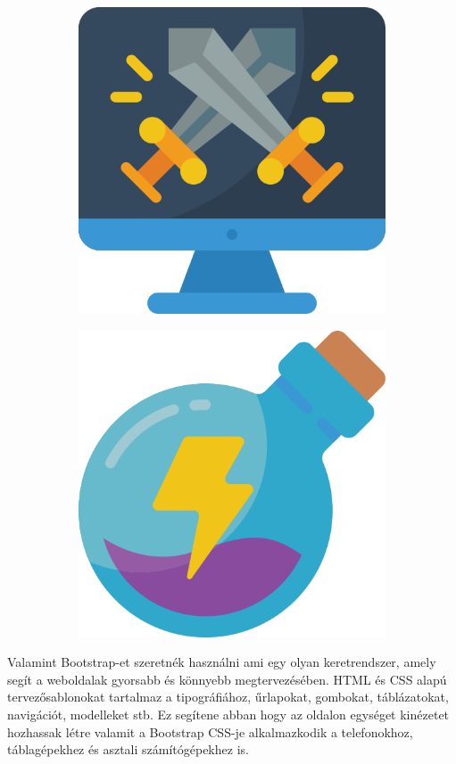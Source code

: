 \begin{figure}[h]
\begin{subfigure}{.1\textwidth}
        \includegraphics[width=.8\linewidth]{images/icons/057-computer.png}
    \end{subfigure}
    \begin{subfigure}{.1\textwidth}
        \centering
        \includegraphics[width=.8\linewidth]{images/icons/058-potion.png}
    \end{subfigure}
\end{figure}


Valamint Bootstrap-et szeretnék használni ami egy olyan keretrendszer, amely segít a weboldalak gyorsabb és könnyebb megtervezésében. HTML és CSS alapú tervezősablonokat tartalmaz a tipográfiához, űrlapokat, gombokat, táblázatokat, navigációt, modelleket stb. Ez segítene abban hogy az oldalon egységet kinézetet hozhassak létre valamit a Bootstrap CSS-je alkalmazkodik a telefonokhoz, táblagépekhez és asztali számítógépekhez is.

